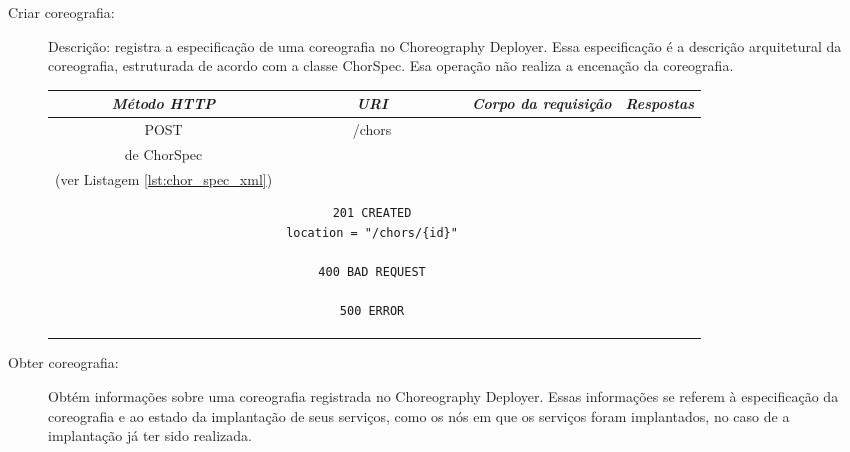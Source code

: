 \begin{description}

\item [Criar coreografia:]

Descrição: registra a especificação de uma coreografia no Choreography Deployer. Essa especificação é a descrição arquitetural da coreografia, estruturada de acordo com a classe ChorSpec. Esa operação não realiza a encenação da coreografia.

%
%

{\small
\begin{tabular}{|c|c|c|c|}
\hline 
\itshape{Método HTTP} & \itshape{URI} & \itshape{Corpo da requisição} & \itshape{Respostas} \\ 
\hline 
POST & /chors & 

\begin{minipage}{2in}
Representação XML \\ de \textsf{ChorSpec}\\ 
(ver Listagem \ref{lst:chor_spec_xml})
\end{minipage} 
&

\begin{minipage}{2in}
\begin{verbatim}

201 CREATED
location = "/chors/{id}"

400 BAD REQUEST

500 ERROR

\end{verbatim}
\end{minipage} 
\\ 
\hline 
\end{tabular} 
}

\item [Obter coreografia:]

Obtém informações sobre uma coreografia registrada no Choreography Deployer. Essas informações se referem à especificação da coreografia e ao estado da implantação de seus serviços, como os nós em que os serviços foram implantados, no caso de a implantação já ter sido realizada.

%
%


\end{description}
